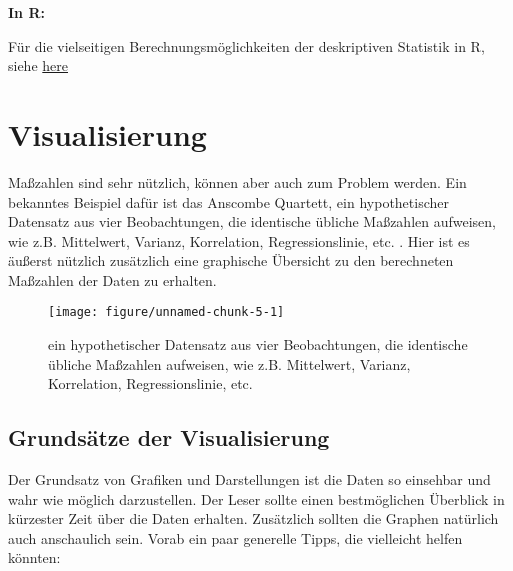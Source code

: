 \documentclass[a4paper,twoside]{tufte-book}\usepackage[]{graphicx}\usepackage[]{color}
\makeatletter
\def\maxwidth{ %
	\ifdim\Gin@nat@width>\linewidth
	\linewidth
	\else
	\Gin@nat@width
	\fi
}
\makeatother
\begin{document}
\vspace{1cm}
\begin{fullwidth}
\begin{mdframed}
    
\textbf{In R:} 

Für die vielseitigen Berechnungsmöglichkeiten der deskriptiven Statistik in R, siehe \href{http://www.uni-kiel.de/psychologie/rexrepos/rerDescriptive.html}{here}

\end{mdframed}
\end{fullwidth} 


\section{Visualisierung}


Maßzahlen sind sehr nützlich, können aber auch zum Problem werden. Ein bekanntes Beispiel dafür ist das Anscombe Quartett, ein hypothetischer Datensatz aus vier Beobachtungen, die identische übliche Maßzahlen aufweisen, wie z.B. Mittelwert, Varianz, Korrelation, Regressionslinie, etc. \citep{Anscombe-Graphsinstatistical-1973}. Hier ist es äußerst nützlich zusätzlich eine graphische Übersicht zu den berechneten Maßzahlen der Daten zu erhalten.

\begin{figure}[htbp]
\begin{center}
\begin{Schunk}

\texttt{[image: figure/unnamed-chunk-5-1]} \end{Schunk}
\caption{ein hypothetischer Datensatz aus vier Beobachtungen, die identische übliche Maßzahlen aufweisen, wie z.B. Mittelwert, Varianz, Korrelation, Regressionslinie, etc.}
\label{fig: Anscombes Quartet}
\end{center}
\end{figure}


\subsection{Grundsätze der Visualisierung}

Der Grundsatz von Grafiken und Darstellungen  ist die Daten so einsehbar und wahr wie möglich darzustellen. Der Leser sollte einen bestmöglichen Überblick in kürzester Zeit über die Daten erhalten. Zusätzlich sollten die Graphen natürlich auch anschaulich sein. Vorab ein paar generelle Tipps, die vielleicht helfen könnten:
\end{document}
